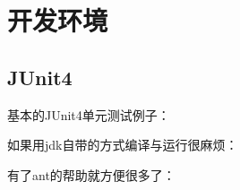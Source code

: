 
\chapter{开发环境}

\section{JUnit4}

	基本的JUnit4单元测试例子：

	

	如果用jdk自带的方式编译与运行很麻烦：

	

	有了ant的帮助就方便很多了：

	
